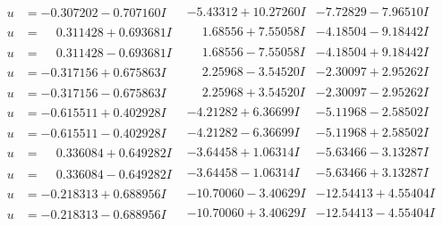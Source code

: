 \documentclass[1p]{elsarticle_modified}
\theoremstyle{definition}
\begin{document}
$$\begin{array}{c|c|c}
\begin{aligned}
u &= -0.307202 - 0.707160 I\end{aligned}
 & -5.43312 + 10.27260 I & -7.72829 - 7.96510 I \\ \hline\begin{aligned}
u &= \phantom{-}0.311428 + 0.693681 I\end{aligned}
 & \phantom{-}1.68556 + 7.55058 I & -4.18504 - 9.18442 I \\ \hline\begin{aligned}
u &= \phantom{-}0.311428 - 0.693681 I\end{aligned}
 & \phantom{-}1.68556 - 7.55058 I & -4.18504 + 9.18442 I \\ \hline\begin{aligned}
u &= -0.317156 + 0.675863 I\end{aligned}
 & \phantom{-}2.25968 - 3.54520 I & -2.30097 + 2.95262 I \\ \hline\begin{aligned}
u &= -0.317156 - 0.675863 I\end{aligned}
 & \phantom{-}2.25968 + 3.54520 I & -2.30097 - 2.95262 I \\ \hline\begin{aligned}
u &= -0.615511 + 0.402928 I\end{aligned}
 & -4.21282 + 6.36699 I & -5.11968 - 2.58502 I \\ \hline\begin{aligned}
u &= -0.615511 - 0.402928 I\end{aligned}
 & -4.21282 - 6.36699 I & -5.11968 + 2.58502 I \\ \hline\begin{aligned}
u &= \phantom{-}0.336084 + 0.649282 I\end{aligned}
 & -3.64458 + 1.06314 I & -5.63466 - 3.13287 I \\ \hline\begin{aligned}
u &= \phantom{-}0.336084 - 0.649282 I\end{aligned}
 & -3.64458 - 1.06314 I & -5.63466 + 3.13287 I \\ \hline\begin{aligned}
u &= -0.218313 + 0.688956 I\end{aligned}
 & -10.70060 - 3.40629 I & -12.54413 + 4.55404 I \\ \hline\begin{aligned}
u &= -0.218313 - 0.688956 I\end{aligned}
 & -10.70060 + 3.40629 I & -12.54413 - 4.55404 I \\ \hline\begin{aligned}

\end{aligned}
\end{array}$$
\end{document}
